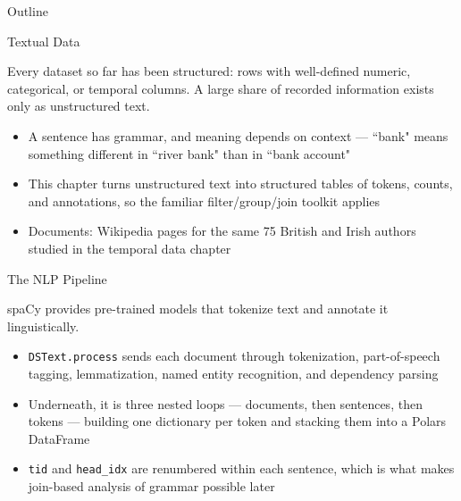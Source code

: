 \documentclass[8pt,aspectratio=169]{beamer}
\begin{document}
\begin{outlineframe}{Outline}
\end{outlineframe}

\begin{textframe}{Textual Data}

Every dataset so far has been structured: rows with well-defined numeric, categorical, or temporal columns. A large share of recorded information exists only as unstructured text.

\begin{itemize}
\item A sentence has grammar, and meaning depends on context --- ``bank" means something different in ``river bank" than in ``bank account"
\item This chapter turns unstructured text into structured tables of tokens, counts, and annotations, so the familiar filter/group/join toolkit applies
\item Documents: Wikipedia pages for the same 75 British and Irish authors studied in the temporal data chapter
\end{itemize}

\end{textframe}

\begin{textframe}{The NLP Pipeline}

spaCy provides pre-trained models that tokenize text and annotate it linguistically.

\begin{itemize}
\item \texttt{DSText.process} sends each document through tokenization, part-of-speech tagging, lemmatization, named entity recognition, and dependency parsing
\item Underneath, it is three nested loops --- documents, then sentences, then tokens --- building one dictionary per token and stacking them into a Polars DataFrame
\item \texttt{tid} and \texttt{head\_idx} are renumbered within each sentence, which is what makes join-based analysis of grammar possible later
\end{itemize}

\end{textframe}
\end{document}
